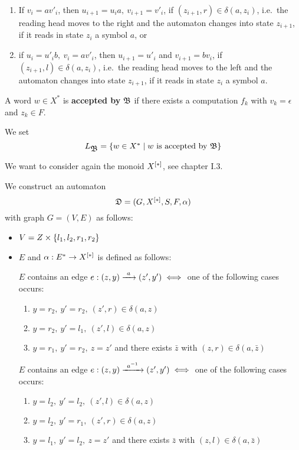 \begin{enumerate}
  \item If $v_i = a v'_i$, then $u_{i+1} = u_i a,\ v_{i+1} = v'_i$, if $(z_{i+1}, r)
\in \delta(a, z_i)$, i.e.\ the reading head moves to the right and the
automaton changes into state $z_{i+1}$, if it reads in state $z_i$ a symbol $a$,
or
\item if $u_i = u'_i b,\ v_i = a v'_i$, then $u_{i+1} = u'_i$ and $v_{i+1} = b
v_i$, if $(z_{i+1}, l) \in \delta(a, z_i)$, i.e.\ the reading head moves to the
left and the automaton changes into state $z_{i+1}$, if it reads in state $z_i$
a symbol $a$.
\end{enumerate}

\bigskip
\begin{definition}
A word $w \in X^*$ is {\bf accepted by} $\mbox{$\mathfrak{B}$}$ if there exists a computation
$f_k$ with $v_k = \epsilon$ and $z_k \in F$.
\end{definition}

We set
\[ L_{\mbox{$\mathfrak{B}$}} = \mbox{$\{w \in X^* \mid w\text{ is accepted by }\mbox{$\mathfrak{B}$}\}$} \]

We want to consider again the monoid $\mbox{${X}^{[*]}$}$, see chapter I.3.

We construct an automaton
\[ \mbox{$\mathfrak{D}$} = (G, \mbox{${X}^{[*]}$}, S, F, \alpha) \]
with graph $G=(V, E)$ as follows:
\begin{itemize}
  \item $V = Z \times \mbox{$\{l_1, l_2, r_1, r_2\}$}$
  \item $E$ and $\alpha: E^* \to \mbox{${X}^{[*]}$}$ is defined as follows:
  
  $E$ contains an edge $e: (z, y) \xrightarrow{\ {a}\ } (z', y') \iff$ one of the following
  cases occurs:
  \begin{enumerate}
    \item $y = r_2,\ y' = r_2,\ (z', r) \in \delta(a, z)$
    \item $y = r_2,\ y' = l_1,\ (z', l) \in \delta(a, z)$
    \item $y = r_1,\ y' = r_2,\ z = z'$ and there exists $\bar{z}$ with $(z, r)
    \in \delta(a, \bar{z})$
  \end{enumerate}

  $E$ contains an edge $e: (z, y) \xrightarrow{\ {{{a}^{-1}}}\ } (z', y') \iff$ one of the
  following cases occurs:
  \begin{enumerate}
    \item $y = l_2,\ y' = l_2,\ (z', l) \in \delta(a, z)$
    \item $y = l_2,\ y' = r_1,\ (z', r) \in \delta(a, z)$
    \item $y = l_1,\ y' = l_2,\ z = z'$ and there exists $\bar{z}$ with $(z, l)
    \in \delta(a, \bar{z})$
  \end{enumerate}
\end{itemize}


